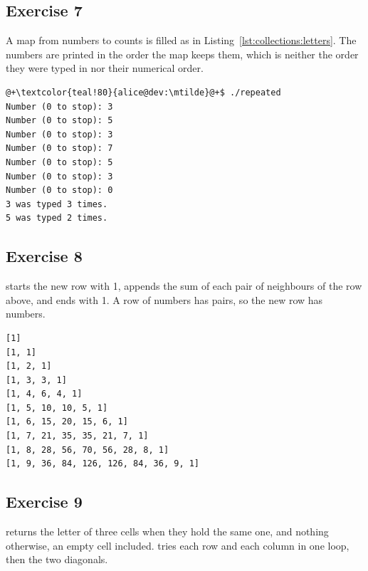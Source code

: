 \subsection*{Exercise 7}

A map from numbers to counts is filled as in
Listing~\ref{lst:collections:letters}. The numbers are printed in the order the
map keeps them, which is neither the order they were typed in nor their
numerical order.


\vspace{-10pt}%
\begin{lstlisting}[style=bashVerb, escapechar=@+]
@+\textcolor{teal!80}{alice@dev:\mtilde}@+$ ./repeated
Number (0 to stop): 3
Number (0 to stop): 5
Number (0 to stop): 3
Number (0 to stop): 7
Number (0 to stop): 5
Number (0 to stop): 3
Number (0 to stop): 0
3 was typed 3 times.
5 was typed 2 times.
\end{lstlisting}

\subsection*{Exercise 8}

 starts the new row with 1, appends the sum of each pair of
neighbours of the row above, and ends with 1. A row of  numbers has
 pairs, so the new row has  numbers.


\vspace{-10pt}%
\begin{lstlisting}[style=bashVerb]
[1]
[1, 1]
[1, 2, 1]
[1, 3, 3, 1]
[1, 4, 6, 4, 1]
[1, 5, 10, 10, 5, 1]
[1, 6, 15, 20, 15, 6, 1]
[1, 7, 21, 35, 35, 21, 7, 1]
[1, 8, 28, 56, 70, 56, 28, 8, 1]
[1, 9, 36, 84, 126, 126, 84, 36, 9, 1]
\end{lstlisting}

\subsection*{Exercise 9}

 returns the letter of three cells when they hold the same one, and
nothing otherwise, an empty cell included.  tries each row and
each column in one loop, then the two diagonals.


